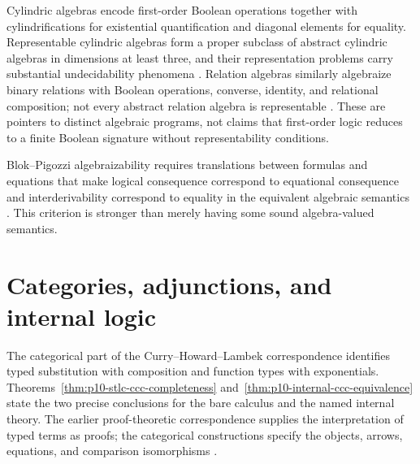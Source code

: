 Cylindric algebras encode first-order Boolean operations together with
cylindrifications for existential quantification and diagonal elements for
equality. Representable cylindric algebras form a proper subclass of abstract
cylindric algebras in dimensions at least three, and their representation
problems carry substantial undecidability phenomena
\cite{HenkinMonkTarski1971}. Relation algebras similarly algebraize binary
relations with Boolean operations, converse, identity, and relational
composition; not every abstract relation algebra is representable
\cite{Tarski1935,Maddux2006}. These are pointers to distinct algebraic
programs, not claims that first-order logic reduces to a finite Boolean
signature without representability conditions.

Blok--Pigozzi algebraizability requires translations between formulas and
equations that make logical consequence correspond to equational consequence
and interderivability correspond to equality in the equivalent algebraic
semantics \cite{BlokPigozzi1989}. This criterion is stronger than merely having
some sound algebra-valued semantics.

\section{Categories, adjunctions, and internal logic}
\label{sec:p10-categorical-logic}






The categorical part of the Curry--Howard--Lambek correspondence
identifies typed substitution with composition and function types with
exponentials.  Theorems~\ref{thm:p10-stlc-ccc-completeness}
and~\ref{thm:p10-internal-ccc-equivalence} state the two precise
conclusions for the bare calculus and the named internal theory.
The earlier proof-theoretic correspondence supplies the interpretation
of typed terms as proofs; the categorical constructions specify the
objects, arrows, equations, and comparison isomorphisms
\cite{Lambek1980,LambekScott1986}.











